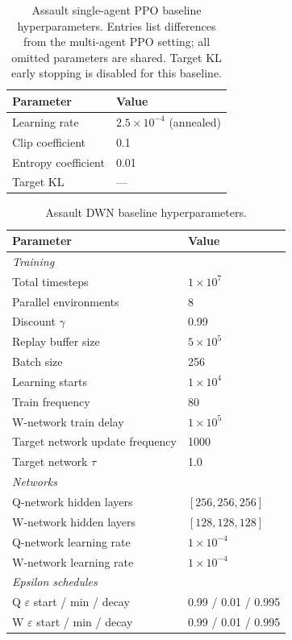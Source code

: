 \begin{table}[h]
\caption{Assault single-agent PPO baseline hyperparameters. Entries list differences from the multi-agent PPO setting; all omitted parameters are shared. Target KL early stopping is disabled for this baseline.}
\label{tab:assault-ppo-hparams}
\centering
\begin{tabular}{ll}
\toprule
Parameter & Value \\
\midrule
Learning rate & $2.5 \times 10^{-4}$ (annealed) \\
Clip coefficient & 0.1 \\
Entropy coefficient & 0.01 \\
Target KL & --- \\
\bottomrule
\end{tabular}
\end{table}

\begin{table}[h]
\caption{Assault DWN baseline hyperparameters.}
\label{tab:assault-dwn-hparams}
\centering
\begin{tabular}{ll}
\toprule
Parameter & Value \\
\midrule
\multicolumn{2}{l}{\textit{Training}} \\
Total timesteps & $1 \times 10^{7}$ \\
Parallel environments & 8 \\
Discount $\gamma$ & 0.99 \\
Replay buffer size & $5 \times 10^{5}$ \\
Batch size & 256 \\
Learning starts & $1 \times 10^{4}$ \\
Train frequency & 80 \\
W-network train delay & $1 \times 10^{5}$ \\
Target network update frequency & 1000 \\
Target network $\tau$ & 1.0 \\
\midrule
\multicolumn{2}{l}{\textit{Networks}} \\
Q-network hidden layers & $[256, 256, 256]$ \\
W-network hidden layers & $[128, 128, 128]$ \\
Q-network learning rate & $1 \times 10^{-4}$ \\
W-network learning rate & $1 \times 10^{-4}$ \\
\midrule
\multicolumn{2}{l}{\textit{Epsilon schedules}} \\
Q $\varepsilon$ start / min / decay & 0.99 / 0.01 / 0.995 \\
W $\varepsilon$ start / min / decay & 0.99 / 0.01 / 0.995 \\
\bottomrule
\end{tabular}
\end{table}
